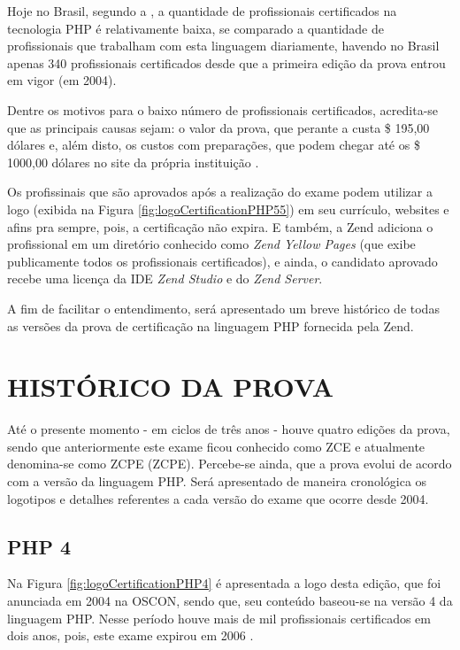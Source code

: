 Hoje no Brasil, segundo a , a
quantidade de profissionais certificados na tecnologia \acs{PHP} é relativamente
baixa, se comparado a quantidade de profissionais que trabalham com esta
linguagem diariamente, havendo no Brasil apenas 340 profissionais certificados
desde que a primeira edição da prova entrou em vigor (em 2004).

Dentre os motivos para o baixo número de profissionais certificados, acredita-se
que as principais causas sejam: o valor da prova, que perante a
 custa \$ 195,00 dólares e, além disto,
os custos com preparações, que podem chegar até os \$ 1000,00 dólares no site da
própria instituição \cite{websiteZendOnlineTraining}.

Os profissinais que são aprovados após a realização do exame podem utilizar a
logo (exibida na Figura \ref{fig:logoCertificationPHP55}) em seu currículo,
websites e afins pra sempre, pois, a certificação não expira. E também, a Zend
adiciona o profissional em um diretório conhecido como \textit{Zend Yellow
Pages} (que exibe publicamente todos os profissionais certificados), e ainda, o
candidato aprovado recebe uma licença da \acs{IDE} \textit{Zend Studio} e do 
\textit{Zend Server}.

A fim de facilitar o entendimento, será apresentado um breve histórico
de todas as versões da prova de certificação na linguagem \acs{PHP} fornecida
pela \acs{Zend}.

\section{HISTÓRICO DA PROVA}

Até o presente momento - em ciclos de três anos - houve quatro edições da
prova, sendo que anteriormente este exame ficou conhecido como \ac{ZCE} e
atualmente denomina-se como \acl{ZCPE} (\acs{ZCPE}). Percebe-se ainda, que a
prova evolui de acordo com a versão da linguagem \acs{PHP}. Será apresentado de
maneira cronológica os logotipos e detalhes referentes a cada versão do exame 
que ocorre desde 2004.

\subsection{PHP 4}

Na Figura \ref{fig:logoCertificationPHP4} é apresentada a logo desta edição, que
foi anunciada em 2004 na \ac{OSCON}, sendo que, seu conteúdo baseou-se na versão
4 da linguagem \acs{PHP}. Nesse período houve mais de mil profissionais
certificados em dois anos, pois, este exame expirou em 2006
\cite{entrevistaAriZCEBrasil}.

